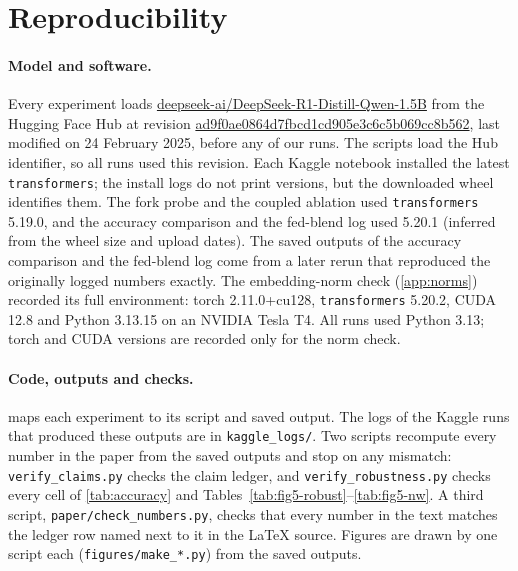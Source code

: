\section{Reproducibility}\label{app:repro}

\paragraph{Model and software.}
Every experiment loads \url{deepseek-ai/DeepSeek-R1-Distill-Qwen-1.5B} from the Hugging Face Hub at revision
\url{ad9f0ae0864d7fbcd1cd905e3c6c5b069cc8b562}, last modified on 24 February 2025, before any of our runs. %
The scripts load the Hub identifier, so all runs used this revision.
Each Kaggle notebook installed the latest \texttt{transformers}; the install logs do not print versions, but the
downloaded wheel identifies them.
The fork probe and the coupled ablation used \texttt{transformers} 5.19.0, and the accuracy comparison and the fed-blend log used 5.20.1 (inferred from the wheel size and upload dates). %
The saved outputs of the accuracy comparison and the fed-blend log come from a later rerun that reproduced the originally logged numbers exactly.
The embedding-norm check (\cref{app:norms}) recorded its full environment: torch 2.11.0+cu128, %
\texttt{transformers} 5.20.2, CUDA 12.8 and Python 3.13.15 on an NVIDIA Tesla T4. %
All runs used Python 3.13; torch and CUDA versions are recorded only for the norm check. %

\paragraph{Code, outputs and checks.}
 maps each experiment to its script and saved output.
The logs of the Kaggle runs that produced these outputs are in \texttt{kaggle\_logs/}.
Two scripts recompute every number in the paper from the saved outputs and stop on any mismatch:
\texttt{verify\_claims.py} checks the claim ledger, and \texttt{verify\_robustness.py} checks every cell of
\cref{tab:accuracy} and Tables~\ref{tab:fig5-robust}--\ref{tab:fig5-nw}.
A third script, \texttt{paper/check\_numbers.py}, checks that every number in the text matches the ledger row named
next to it in the \LaTeX{} source.
Figures are drawn by one script each (\texttt{figures/make\_*.py}) from the saved outputs.

